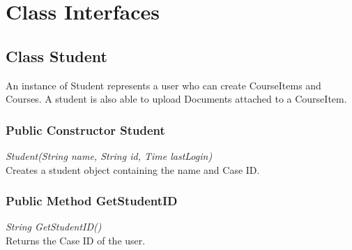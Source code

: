 \documentclass[16pt]{scrreprt}
\begin{document}
%

\chapter{Class Interfaces}

\section{Class Student}
An instance of Student represents a user who can create CourseItems and Courses. A student is also able to upload Documents attached to a CourseItem.

\subsection{Public Constructor Student}
\textit{Student(String name, String id, Time lastLogin)} \\
Creates a student object containing the name and Case ID.

\subsection{Public Method GetStudentID}
\textit{String GetStudentID()} \\
Returns the Case ID of the user.
\end{document}
